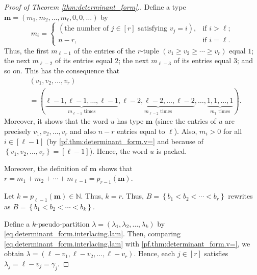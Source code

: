 \documentclass[reqno]{amsart}
\newcommand{\0}{\phantom{c}}
\theoremstyle{plain}
\theoremstyle{definition}
\numberwithin{equation}{section}
\begin{document}
\begin{proof}
[Proof of Theorem \ref{thm:determinant_form}.]Define a type $\mathbf{m}%
=\left(  m_{1},m_{2},\ldots,m_{\ell},0,0,\ldots\right)  $ by
\[
m_{i}=%
\begin{cases}
\left(  \text{the number of }j\in\left[  r\right]  \text{ satisfying }%
v_{j}=i\right)  , & \text{if }i>\ell;\\
n-r, & \text{if }i=\ell.
\end{cases}
\]
Thus, the first $m_{\ell-1}$ of the entries of the $r$-tuple $\left(
v_{1}\geq v_{2}\geq\dotsm\geq v_{r}\right)  $ equal $1$; the next $m_{\ell-2}$
of its entries equal $2$; the next $m_{\ell-3}$ of its entries equal $3$; and
so on. This has the consequence that%
\begin{align}
&  \left(  v_{1},v_{2},\ldots,v_{r}\right) \nonumber\\
&  =\left(  \underbrace{\ell-1,\ell-1,\ldots,\ell-1}_{m_{\ell-1}\text{ times}%
},\underbrace{\ell-2,\ell-2,\ldots,\ell-2}_{m_{\ell-2}\text{ times}}%
,\ldots,\underbrace{1,1,\ldots,1}_{m_{1}\text{ times}}\right)  .
\label{pf.thm:determinant_form.v=}%
\end{align}
Moreover, it shows that the word $u$ has type $\mathbf{m}$ (since the entries
of $u$ are precisely $v_{1},v_{2},\ldots,v_{r}$ and also $n-r$ entries equal
to $\ell$). Also, $m_{i}>0$ for all $i\in\left[  \ell-1\right]  $ (by
\eqref{pf.thm:determinant_form.v=} and because of $\left\{  v_{1},v_{2}%
,\ldots,v_{r}\right\}  =\left[  \ell-1\right]  $). Hence, the word $u$ is packed.

Moreover, the definition of $\mathbf{m}$ shows that $r=m_{1}+m_{2}%
+\cdots+m_{\ell-1}=p_{r-1}\left(  \mathbf{m}\right)  $.

Let $k=p_{\ell-1}\left(  \mathbf{m}\right)  \in\mathbb{N}$. Thus, $k=r$. Thus,
$B=\left\{  b_{1}<b_{2}<\cdots<b_{r}\right\}  $ rewrites as $B=\left\{
b_{1}<b_{2}<\cdots<b_{k}\right\}  $.

Define a $k$-pseudo-partition $\lambda=\left(  \lambda_{1},\lambda_{2}%
,\ldots,\lambda_{k}\right)  $ by \eqref{eq.determinant_form.interlacing.lam}.
Then, comparing \eqref{eq.determinant_form.interlacing.lam} with
\eqref{pf.thm:determinant_form.v=}, we obtain $\lambda=\left(  \ell-v_{1}%
,\ell-v_{2},\ldots,\ell-v_{r}\right)  $. Hence, each $j\in\left[  r\right]  $
satisfies $\lambda_{j}=\ell-v_{j}=\gamma_{j}$.


\end{proof}
\end{document}
